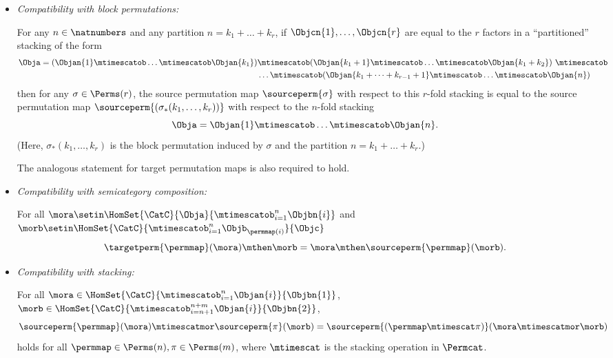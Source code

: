\begin{ctdefinition}
\begin{itemize}
        \item \emph{Compatibility with block permutations:}

              For any $n \in \natnumbers$ and any partition $n = k_1 + \dots + k_r$, if $\Objcn{1}, \dots, \Objcn{r}$ are equal to the $r$ factors in a ``partitioned'' stacking of the form
              \begin{align*}
                  \Obja = (\Objan{1} \mtimescatob \dots \mtimescatob \Objan{k_1}) & \mtimescatob (\Objan{k_1 + 1} \mtimescatob \dots \mtimescatob \Objan{k_1 + k_2}) \ \mtimescatob \\ & \dots \mtimescatob (\Objan{k_1 + \dots + k_{r-1} +1} \mtimescatob \dots \mtimescatob \Objan{n})
              \end{align*}
              then for any $\sigma \in \Perms(r)$, the source permutation map $\sourceperm{\sigma}$ with respect to this $r$-fold stacking is equal to the source permutation map $\sourceperm{(\sigma_*(k_1, \dots, k_r))}$ with respect to the $n$-fold stacking
              \begin{equation*}
                  \Obja = \Objan{1} \mtimescatob \dots \mtimescatob \Objan{n}.
              \end{equation*}
              (Here, $\sigma_*(k_1, \dots, k_r)$ is the block permutation induced by $\sigma$ and the partition $n = k_1 + \dots + k_r$.)

              The analogous statement for target permutation maps is also required to hold.

        \item \emph{Compatibility with semicategory composition:}

              For all $\mora \setin \HomSet{\CatC}{\Obja}{\mtimescatob_{i=1}^n \Objbn{i}}$ and $\morb \setin \HomSet{\CatC}{\mtimescatob_{i=1}^n \Objb_{\permmap(i)}}{\Objc}$
              \begin{equation}
                  \label{eq:perm-compatibility-with-composition}
                  \targetperm{\permmap} (\mora) \mthen \morb = \mora \mthen \sourceperm{\permmap}(\morb).
              \end{equation}

        \item \emph{Compatibility with stacking:}

              For all $\mora \in \HomSet{\CatC}{\mtimescatob_{i=1}^n \Objan{i}}{\Objbn{1}}$, $\morb \in \HomSet{\CatC}{\mtimescatob_{i=n+1}^{n+m} \Objan{i}}{\Objbn{2}}$,
              \begin{equation}
                  \sourceperm{\permmap}(\mora) \mtimescatmor \sourceperm{\pi}(\morb) = \sourceperm{(\permmap \mtimescat \pi)}(\mora \mtimescatmor \morb)
              \end{equation}
              holds for all $\permmap \in \Perms(n), \pi \in \Perms(m)$, where $\mtimescat$ is the stacking operation in $\Permcat$.


\end{itemize}
\end{ctdefinition}
